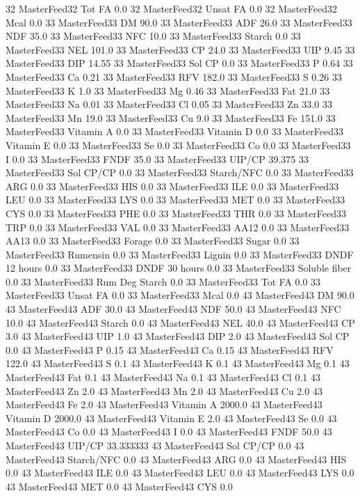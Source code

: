 \documentclass[letterpaper,10pt,english]{sphinxmanual}
\begin{document}
\begin{sphinxVerbatim}[commandchars=\\\{\},numbers=left,firstnumber=1,stepnumber=1]
32 MasterFeed32 Tot FA 0.0
32 MasterFeed32 Unsat FA 0.0
32 MasterFeed32 Mcal 0.0
33 MasterFeed33 DM 90.0
33 MasterFeed33 ADF 26.0
33 MasterFeed33 NDF 35.0
33 MasterFeed33 NFC 10.0
33 MasterFeed33 Starch 0.0
33 MasterFeed33 NEL 101.0
33 MasterFeed33 CP 24.0
33 MasterFeed33 UIP 9.45
33 MasterFeed33 DIP 14.55
33 MasterFeed33 Sol CP 0.0
33 MasterFeed33 P 0.64
33 MasterFeed33 Ca 0.21
33 MasterFeed33 RFV 182.0
33 MasterFeed33 S 0.26
33 MasterFeed33 K 1.0
33 MasterFeed33 Mg 0.46
33 MasterFeed33 Fat 21.0
33 MasterFeed33 Na 0.01
33 MasterFeed33 Cl 0.05
33 MasterFeed33 Zn 33.0
33 MasterFeed33 Mn 19.0
33 MasterFeed33 Cu 9.0
33 MasterFeed33 Fe 151.0
33 MasterFeed33 Vitamin A 0.0
33 MasterFeed33 Vitamin D 0.0
33 MasterFeed33 Vitamin E 0.0
33 MasterFeed33 Se 0.0
33 MasterFeed33 Co 0.0
33 MasterFeed33 I 0.0
33 MasterFeed33 FNDF 35.0
33 MasterFeed33 UIP/CP 39.375
33 MasterFeed33 Sol CP/CP 0.0
33 MasterFeed33 Starch/NFC 0.0
33 MasterFeed33 ARG 0.0
33 MasterFeed33 HIS 0.0
33 MasterFeed33 ILE 0.0
33 MasterFeed33 LEU 0.0
33 MasterFeed33 LYS 0.0
33 MasterFeed33 MET 0.0
33 MasterFeed33 CYS 0.0
33 MasterFeed33 PHE 0.0
33 MasterFeed33 THR 0.0
33 MasterFeed33 TRP 0.0
33 MasterFeed33 VAL 0.0
33 MasterFeed33 AA\PYGZsh{}12 0.0
33 MasterFeed33 AA\PYGZsh{}13 0.0
33 MasterFeed33 \PYGZpc{} Forage 0.0
33 MasterFeed33 Sugar \PYGZpc{} 0.0
33 MasterFeed33 Rumensin 0.0
33 MasterFeed33 Lignin 0.0
33 MasterFeed33 DNDF 12 hours 0.0
33 MasterFeed33 DNDF 30 hours 0.0
33 MasterFeed33 Soluble fiber 0.0
33 MasterFeed33 Rum Deg Starch 0.0
33 MasterFeed33 Tot FA 0.0
33 MasterFeed33 Unsat FA 0.0
33 MasterFeed33 Mcal 0.0
43 MasterFeed43 DM 90.0
43 MasterFeed43 ADF 30.0
43 MasterFeed43 NDF 50.0
43 MasterFeed43 NFC 10.0
43 MasterFeed43 Starch 0.0
43 MasterFeed43 NEL 40.0
43 MasterFeed43 CP 3.0
43 MasterFeed43 UIP 1.0
43 MasterFeed43 DIP 2.0
43 MasterFeed43 Sol CP 0.0
43 MasterFeed43 P 0.15
43 MasterFeed43 Ca 0.15
43 MasterFeed43 RFV 122.0
43 MasterFeed43 S 0.1
43 MasterFeed43 K 0.1
43 MasterFeed43 Mg 0.1
43 MasterFeed43 Fat 0.1
43 MasterFeed43 Na 0.1
43 MasterFeed43 Cl 0.1
43 MasterFeed43 Zn 2.0
43 MasterFeed43 Mn 2.0
43 MasterFeed43 Cu 2.0
43 MasterFeed43 Fe 2.0
43 MasterFeed43 Vitamin A 2000.0
43 MasterFeed43 Vitamin D 2000.0
43 MasterFeed43 Vitamin E 2.0
43 MasterFeed43 Se 0.0
43 MasterFeed43 Co 0.0
43 MasterFeed43 I 0.0
43 MasterFeed43 FNDF 50.0
43 MasterFeed43 UIP/CP 33.333333
43 MasterFeed43 Sol CP/CP 0.0
43 MasterFeed43 Starch/NFC 0.0
43 MasterFeed43 ARG 0.0
43 MasterFeed43 HIS 0.0
43 MasterFeed43 ILE 0.0
43 MasterFeed43 LEU 0.0
43 MasterFeed43 LYS 0.0
43 MasterFeed43 MET 0.0
43 MasterFeed43 CYS 0.0

\end{sphinxVerbatim}
\end{document}
